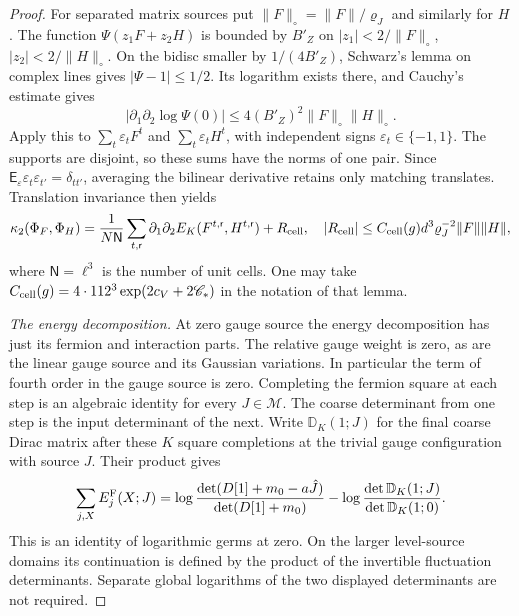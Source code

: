 \documentclass[11pt,letterpaper,reqno]{amsart}
\theoremstyle{definition}
\theoremstyle{remark}
\begin{document}
\begin{proof}
For separated matrix sources put
$\|F\|_\circ=\|F\|/\varrho_J$ and similarly for $H$.
The function $\Psi(z_1F+z_2H)$ is bounded by $B'_Z$
on $|z_1|<2/\|F\|_\circ$, $|z_2|<2/\|H\|_\circ$.
On the bidisc smaller by $1/(4B'_Z)$, Schwarz's lemma
on complex lines gives $|\Psi-1|\le1/2$. Its logarithm
exists there, and Cauchy's estimate gives
\[
 |\partial_1\partial_2\log\Psi(0)|
       \le4(B'_Z)^2\|F\|_\circ\|H\|_\circ.
\]
Apply this to
$\sum_t\varepsilon_tF^t$ and $\sum_t\varepsilon_tH^t$,
with independent signs $\varepsilon_t\in\{-1,1\}$.
The supports are disjoint, so these sums have the
norms of one pair. Since
$\mathsf E_\varepsilon\varepsilon_t\varepsilon_{t'}
=\delta_{tt'}$, averaging the bilinear derivative
retains only matching translates. Translation invariance
then yields
\[
 \kappa_2(\Phi_F,\Phi_H)
 =\frac1{N\mathsf N}\sum_{t,\mathsf r}
       \partial_1\partial_2E_K(F^{t,\mathsf r},H^{t,\mathsf r})
       +R_{\rm cell},
 \quad
 |R_{\rm cell}|\le C_{\rm cell}(g)d^3\varrho_J^{-2}\|F\|\|H\|,
\]
where $\mathsf N=\ell^3$ is the number of unit cells.
One may take $C_{\rm cell}(g)=4\cdot112^3
\exp(2c_V+2\mathscr C_*)$ in the notation of that lemma.

\emph{The energy decomposition.}
At zero gauge source the energy decomposition
\cite[Lem. 11.4]{QCDM1} has just its fermion and interaction
parts. The relative gauge weight is zero, as are the
linear gauge source and its Gaussian variations. In
particular the term of fourth order in the gauge source
is zero. Completing the fermion square at each step is
an algebraic identity for every $J\in\mathcal M$. The
coarse determinant from one step is the input determinant
of the next. Write $\mathbb D_K(1;J)$ for the final coarse
Dirac matrix after these $K$ square completions at the
trivial gauge configuration with source $J$. Their product gives
\[
 \sum_{j,X}E_j^{\rm F}(X;J)
 =\log\frac{\det(D[1]+m_0-a\hat J)}{\det(D[1]+m_0)}
       -\log\frac{\det\mathbb D_K(1;J)}{\det\mathbb D_K(1;0)}.
\]
This is an identity of logarithmic germs at zero.
On the larger level-source domains its continuation
is defined by the product of the invertible fluctuation
determinants. Separate global logarithms of the two
displayed determinants are not required.


\end{proof}
\end{document}
